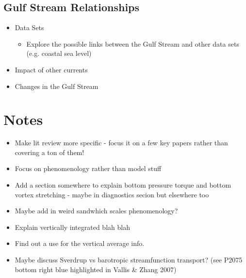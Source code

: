 \documentclass[a4paper,11pt]{article}
\begin{document}
\subsection{Gulf Stream Relationships}
\begin{itemize}
  \item Data Sets    \citep{Ezer2015}
  \begin{itemize}
    \item Explore the possible links between the Gulf Stream and other data sets (e.g. coastal sea level)
  \end{itemize}
  \item Impact of other currents    \citep{Ezer2015}
  \item Changes in the Gulf Stream \citep{Greatbatch1991} \citep{Ezer2015}
\end{itemize}


\section*{Notes}
\begin{itemize}
	\item Make lit review more specific - focus it on a few key papers rather than covering a ton of them!
	\item Focus on phenomenology rather than model stuff
	\item Add a section somewhere to explain bottom pressure torque and bottom vortex stretching - maybe in diagnostics secion but elsewhere too
	\item Maybe add in weird sandwhich scales phenomenology?
	\item Explain vertically integrated blah blah
	\item Find out a use for the vertical average info.
	\item Maybe discuss Sverdrup vs barotropic streamfunction transport? (see P2075 bottom right blue highlighted in Vallis \& Zhang 2007)
\end{itemize}

%


%
%
%
%
%
%
\end{document}
